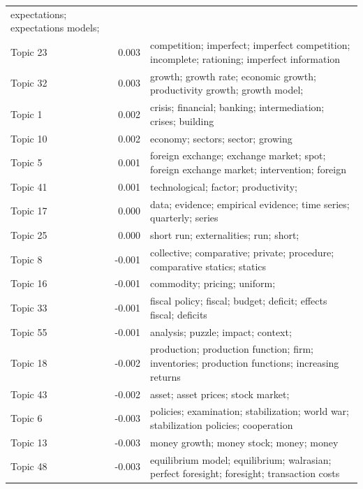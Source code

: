 \documentclass[]{elsarticle} %
\begin{document}
\begin{table}[!h]
\begin{threeparttable}
\begin{tabular}[t]{lrl}
expectations; expectations models;
\cellcolor{gray!6}{expectations model; price expectations}\\
\addlinespace
Topic 23 & 0.003 & competition; imperfect; imperfect
competition; incomplete; rationing;
imperfect information\\
Topic 32 & 0.003 & growth; growth rate; economic growth;
productivity growth; growth model;
\cellcolor{gray!6}{growth rates}\\
Topic 1 & 0.002 & crisis; financial; banking;
intermediation; crises; building\\
Topic 10 & 0.002 & economy; sectors; sector; growing
\cellcolor{gray!6}{economy; closed; growing}\\
Topic 5 & 0.001 & foreign exchange; exchange market; spot;
foreign exchange market; intervention;
foreign\\
\addlinespace
Topic 41 & 0.001 & technological; factor; productivity;
\cellcolor{gray!6}{intensity; education; skill}\\
Topic 17 & 0.000 & data; evidence; empirical evidence; time
series; quarterly; series\\
Topic 25 & 0.000 & short run; externalities; run; short;
\cellcolor{gray!6}{run equilibrium; neutrality}\\
Topic 8 & -0.001 & collective; comparative; private;
procedure; comparative statics; statics\\
Topic 16 & -0.001 & commodity; pricing; uniform;
\cellcolor{gray!6}{commodities; community; consumer}\\
\addlinespace
Topic 33 & -0.001 & fiscal policy; fiscal; budget; deficit;
effects fiscal; deficits\\
Topic 55 & -0.001 & analysis; puzzle; impact; context;
\cellcolor{gray!6}{effects; simulations}\\
Topic 18 & -0.002 & production; production function; firm;
inventories; production functions;
increasing returns\\
Topic 43 & -0.002 & asset; asset prices; stock market;
\cellcolor{gray!6}{assets; stocks; stock}\\
Topic 6 & -0.003 & policies; examination; stabilization;
world war; stabilization policies;
cooperation\\
\addlinespace
Topic 13 & -0.003 & money growth; money stock; money; money
\cellcolor{gray!6}{supply; monetary growth; transmission}\\
Topic 48 & -0.003 & equilibrium model; equilibrium;
walrasian; perfect foresight; foresight;
transaction costs\\

\end{tabular}
\end{threeparttable}
\end{table}
\end{document}
